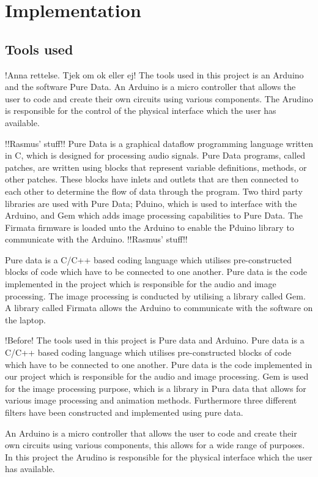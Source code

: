 \chapter{Implementation}\label{ch:implementation}

\section{Tools used}\label{sec:toolsused}
!Anna rettelse. Tjek om ok eller ej!
The tools used in this project is an Arduino and the software Pure Data. 
An Arduino is a micro controller that allows the user to code and create their own circuits using various components. The Arudino is responsible for the control of the physical interface which the user has available.


!!Rasmus' stuff!!
Pure Data is a graphical dataflow programming language written in C, which is designed for processing audio signals. Pure Data programs, called patches, are written using blocks that represent variable definitions, methods, or other patches. These blocks have inlets and outlets that are then connected to each other to determine the flow of data through the program. Two third party libraries are used with Pure Data; Pduino, which is used to interface with the Arduino, and Gem which adds image processing capabilities to Pure Data. The Firmata firmware is loaded unto the Arduino to enable the Pduino library to communicate with the Arduino.
!!Rasmus' stuff!!

Pure data is a C/C++ based coding language which utilises pre-constructed blocks of code which have to be connected to one another. Pure data is the code implemented in the project which is responsible for the audio and image processing. The image processing is conducted by utilising a library called Gem. 
A library called Firmata allows the Arduino to communicate with the software on the laptop.


!Before!
The tools used in this project is Pure data and Arduino. 
Pure data is a C/C++ based coding language which utilises pre-constructed blocks of code which have to be connected to one another. Pure data is the code implemented in our project which is responsible for the audio and image processing. Gem is used for the image processing purpose, which is a library in Pura data that allows for various image processing and animation methods.  
Furthermore three different filters have been constructed and implemented using pure data.

An Arduino is a micro controller that allows the user to code and create their own circuits using various components, this allows for a wide range of purposes. In this project the Arudino is responsible for the physical interface which the user has available. 

